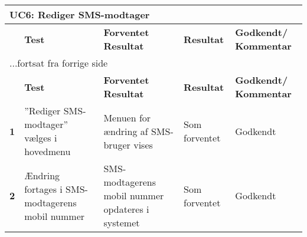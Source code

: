 
\begin{center}
\begin{longtable}{|p{}|p{}|p{}|p{}|p{}|} %
\hline
\multicolumn{5}{|l|}{\textbf{UC6: Rediger SMS-modtager}} \\ \hline
\multicolumn{1}{|c|}{} &
\textbf{Test} &
\textbf{Forventet \newline Resultat} &
\textbf{Resultat} &
\textbf{Godkendt/ \newline Kommentar} \\ \hline 
\endfirsthead

\multicolumn{5}{l}{...fortsat fra forrige side} \\ \hline 
\multicolumn{1}{|c|}{} &
\textbf{Test} &
\textbf{Forventet \newline Resultat} &
\textbf{Resultat} &
\textbf{Godkendt/ \newline Kommentar} \\ \hline 
\endhead


\textbf{1} &
''Rediger SMS-modtager'' vælges i hovedmenu &
Menuen for ændring af SMS-bruger vises 
&Som \newline forventet
&Godkendt

 \\\hline

\textbf{2} &
Ændring fortages i SMS-modtagerens mobil nummer &
SMS-modtagerens mobil nummer opdateres i systemet
&Som \newline forventet
&Godkendt
 \\\hline


	\end{longtable}
	\label{ATUC6} 
\end{center}